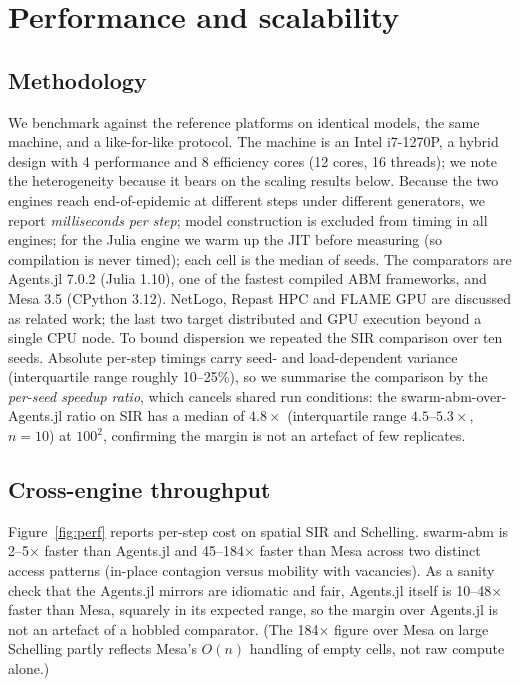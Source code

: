 \documentclass[review]{elsarticle}
\begin{document}
\section{Performance and scalability}
\label{sec:perf}

\subsection{Methodology}
We benchmark against the reference platforms on identical models, the same
machine, and a like-for-like protocol. The machine is an Intel i7-1270P, a
hybrid design with 4 performance and 8 efficiency cores (12 cores, 16 threads);
we note the heterogeneity because it bears on the scaling results below. Because the
two engines reach end-of-epidemic at different steps under different
generators, we report \emph{milliseconds per step}; model construction is
excluded from timing in all engines; for the Julia engine we warm up the JIT
before measuring (so compilation is never timed); each cell is the median of
seeds. The comparators are Agents.jl 7.0.2 (Julia 1.10), one of the fastest
compiled ABM frameworks, and Mesa 3.5 (CPython 3.12). NetLogo, Repast HPC
\cite{collier2013repast} and FLAME GPU \cite{richmond2023flamegpu} are discussed
as related work; the last two target distributed and GPU execution beyond a
single CPU node. To bound dispersion we repeated the SIR comparison over ten
seeds. Absolute per-step timings carry seed- and load-dependent variance
(interquartile range roughly 10--25\%), so we summarise the comparison by the
\emph{per-seed speedup ratio}, which cancels shared run conditions: the
swarm-abm-over-Agents.jl ratio on SIR has a median of $4.8\times$ (interquartile
range $4.5$--$5.3\times$, $n=10$) at $100^2$, confirming the margin is not an
artefact of few replicates.

\subsection{Cross-engine throughput}
Figure~\ref{fig:perf} reports per-step cost on spatial SIR and Schelling.
swarm-abm is 2--5$\times$ faster than Agents.jl and 45--184$\times$ faster than
Mesa across two distinct access patterns (in-place contagion versus mobility
with vacancies). As a sanity check that the Agents.jl mirrors are idiomatic and
fair, Agents.jl itself is 10--48$\times$ faster than Mesa, squarely in its
expected range, so the margin over Agents.jl is not an artefact of a
hobbled comparator. (The 184$\times$ figure over Mesa on large Schelling partly
reflects Mesa's $O(n)$ handling of empty cells, not raw compute alone.)
\end{document}
